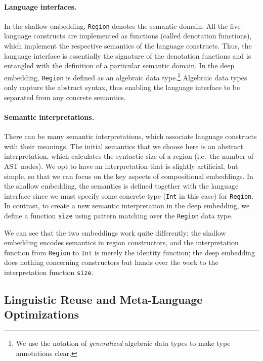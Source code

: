\paragraph{Language interfaces.}
In the shallow embedding, \lstinline{Region} denotes the semantic domain. All
the five language constructs are implemented as functions (called denotation
functions), which implement the respective semantics of the language constructs.
Thus, the language interface is essentially the signature of the denotation
functions and is entangled with the definition of a particular semantic domain.
In the deep embedding, \lstinline{Region} is defined as an algebraic data
type.\footnote{We use the notation of \emph{generalized} algebraic data types to
make type annotations clear.} Algebraic data types only capture the abstract
syntax, thus enabling the language interface to be separated from any concrete
semantics.

\paragraph{Semantic interpretations.}
There can be many semantic interpretations, which associate language constructs
with their meanings. The initial semantics that we choose here is an abstract
interpretation, which calculates the syntactic size of a region (i.e.~the number
of AST nodes). We opt to have an interpretation that is slightly artificial, but
simple, so that we can focus on the key aspects of compositional embeddings. In
the shallow embedding, the semantics is defined together with the language
interface since we must specify some concrete type (\lstinline{Int} in this
case) for \lstinline{Region}. In contrast, to create a new semantic
interpretation in the deep embedding, we define a function \lstinline{size}
using pattern matching over the \lstinline{Region} data type. 

We can see that the two embeddings work quite differently: the shallow embedding
encodes semantics in region constructors, and the interpretation function from
\lstinline{Region} to \lstinline{Int} is merely the identity function; the deep
embedding does nothing concerning constructors but hands over the work to the
interpretation function \lstinline{size}.

\subsection{Linguistic Reuse and Meta-Language Optimizations} \label{sec:meta}

